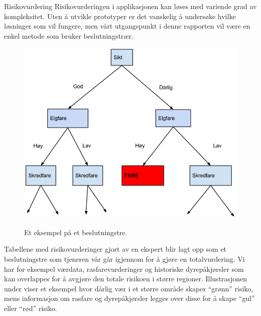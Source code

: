 \documentclass[a4paper,norsk,oneside]{book}
\begin{document}
Risikovurdering
Risikovurderingen i applikasjonen kan løses med variende grad av kompleksitet. Uten å utvikle prototyper er det vanskelig å undersøke hvilke løsninger som vil fungere, men vårt utgangspunkt i denne rapporten vil være en enkel metode som bruker beslutningstrær.

\begin{figure}[H]
\centering
\includegraphics[scale=0.35]{figs/decision.png}
\label{desicion}
\caption{Et eksempel på et beslutningstre.}
\end{figure}

Tabellene med risikovurderinger gjort av en ekspert blir lagt opp som et beslutningstre som tjeneren vår går igjennom for å gjøre en totalvurdering. Vi har for eksempel værdata, rasfarevurderinger og historiske dyrepåkjørsler som kan overlappes for å avgjøre den totale risikoen i større regioner. Illustrasjonen under viser et eksempel hvor dårlig vær i et større område skaper “grønn” risiko, mens informasjon om rasfare og dyrepåkjørsler legges over disse for å skape “gul” eller “rød” risiko.
\end{document}
